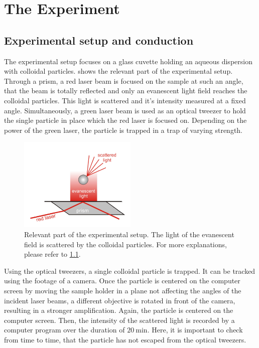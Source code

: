 \documentclass[../bericht.tex]{subfiles}
\begin{document}
  \chapter{The Experiment}

    \section{Experimental setup and conduction}
    \label{sec:exp-setup}

      The experimental setup focuses on a glass cuvette holding an aqueous dispersion with colloidal particles.  shows the relevant part of the experimental setup. Through a prism, a red laser beam is focused on the sample at such an angle, that the beam is totally reflected and only an evanescent light field reaches the colloidal particles. This light is scattered and it's intensity measured at a fixed angle. Simultaneously, a green laser beam is used as an optical tweezer to hold the single particle in place which the red laser is focused on. Depending on the power of the green laser, the particle is trapped in a trap of varying strength.
      \medskip

      \begin{figure}[h]
        \centering
        \includegraphics[width=0.5\textwidth]{figures/eyp_setup.png}
        \caption{Relevant part of the experimental setup. The light of the evanescent field is scattered by the colloidal particles. For more explanations, please refer to \cref{sec:exp-setup}.}
        \label{fig:exp-setup}
      \end{figure}

      Using the optical tweezers, a single colloidal particle is trapped. It can be tracked using the footage of a camera. Once the particle is centered on the computer screen by moving the sample holder in a plane not affecting the angles of the incident laser beams, a different objective is rotated in front of the camera, resulting in a stronger amplification. Again, the particle is centered on the computer screen. Then, the intensity of the scattered light is recorded by a computer program over the duration of $\SI{20}{\minute}$. Here, it is important to check from time to time, that the particle has not escaped from the optical tweezers.
\end{document}
